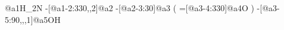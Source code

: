                      @{a1}H_2N%
    -[@{a1-2}:330,,2]@{a2}%
        -[@{a2-3}:30]@{a3}%
                        (
           =[@{a3-4}:330]@{a4}O%
                        )
    -[@{a3-5}:90,,,1]@{a5}OH%